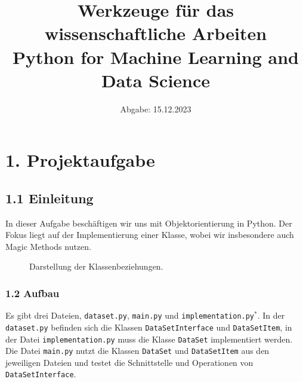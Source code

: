 \documentclass{article}
\begin{document}
\title{\textbf{\Large Werkzeuge für das wissenschaftliche Arbeiten}\\
 \normalsize Python for Machine Learning and Data Science}
\date{Abgabe: 15.12.2023}
\maketitle

\renewcommand{\contentsname}{Inhaltsverzeichnis} 
\tableofcontents 

\vspace{2em}

\section*{1. Projektaufgabe}

\subsection*{1.1 Einleitung}
In dieser Aufgabe beschäftigen wir uns mit Objektorientierung in Python. Der Fokus liegt auf der Implementierung einer Klasse, wobei wir insbesondere auch Magic Methods nutzen.\\

\vspace{2em}

\renewcommand{\figurename}{Abbildung}
\begin{figure}[htbp]
  \centering
  
  \caption{Darstellung der Klassenbeziehungen.\normalsize}
\end{figure}

\newpage
\subsubsection*{1.2 Aufbau}
Es gibt drei Dateien, \texttt{dataset.py}, \texttt{main.py} und \texttt{implementation.py}$^{*}$. In der \texttt{dataset.py} befinden sich die Klassen \texttt{DataSetInterface} und \texttt{DataSetItem}, in der Datei \texttt{implementation.py} muss die Klasse \texttt{DataSet} implementiert werden. Die Datei \texttt{main.py} nutzt die Klassen \texttt{DataSet} und \texttt{DataSetItem} aus den jeweiligen Dateien und testet die Schnittstelle und Operationen von \texttt{DataSetInterface}.\\
\end{document}
